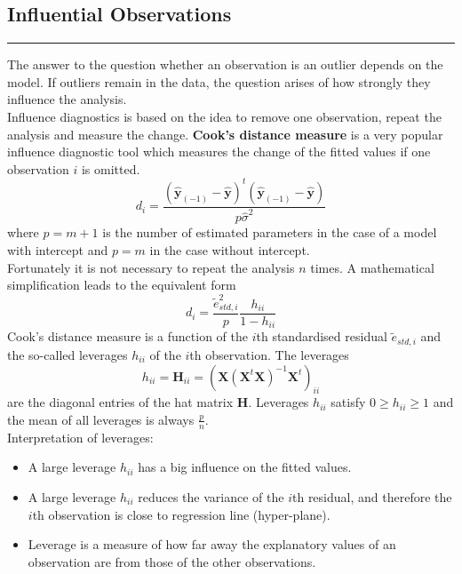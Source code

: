 \subsection{Influential Observations}
\noindent\rule[\linienAbstand]{\linewidth}{\linienDicke}
The answer to the question whether an observation is an outlier depends on the model. If outliers remain in the data, the question arises of how strongly they influence the analysis.\\
Influence diagnostics is based on the idea to remove one observation, repeat the analysis and measure the change. \textbf{Cook’s distance measure} is a very popular influence diagnostic tool which measures the change of the fitted values if one observation $i$ is omitted.
\begin{equation}
  d_i = \frac{(\hat{\textbf{y}}_{(-1)} - \hat{\textbf{y}})^t(\hat{\textbf{y}}_{(-1)}-\hat{\textbf{y}})}{p \hat{\sigma}^2}
\end{equation}
where $p = m + 1$ is the number of estimated parameters in the case of a model with intercept and $p = m$ in the case without intercept.\\
Fortunately it is not necessary to repeat the analysis $n$ times. A mathematical simplification leads to the equivalent form
\begin{equation}
  d_i = \frac{\tilde{e}_{std,i}^2}{p}\frac{h_{ii}}{1-h_{ii}}
\end{equation}
Cook’s distance measure is a function of the $i$th standardised residual $\tilde{e}_{std,i}$ and the so-called leverages $h_{ii}$ of the $i$th observation. The leverages
\begin{equation}
  h_{ii} = \textbf{H}_{ii} = (\textbf{X}(\textbf{X}^t\textbf{X})^{-1}\textbf{X}^t)_{ii}
\end{equation}
are the diagonal entries of the hat matrix $\textbf{H}$. Leverages $h_{ii}$ satisfy $0 \geq h_{ii} \geq 1$ and the mean of all leverages is always $\frac{p}{n}$.\\

Interpretation of leverages:
\begin{itemize}
  \item A large leverage $h_{ii}$ has a big influence on the fitted values.
  \item A large leverage $h_{ii}$ reduces the variance of the $i$th residual, and therefore the $i$th observation is close to regression line (hyper-plane).
  \item Leverage is a measure of how far away the explanatory values of an observation are from those of the other observations.
\end{itemize}

